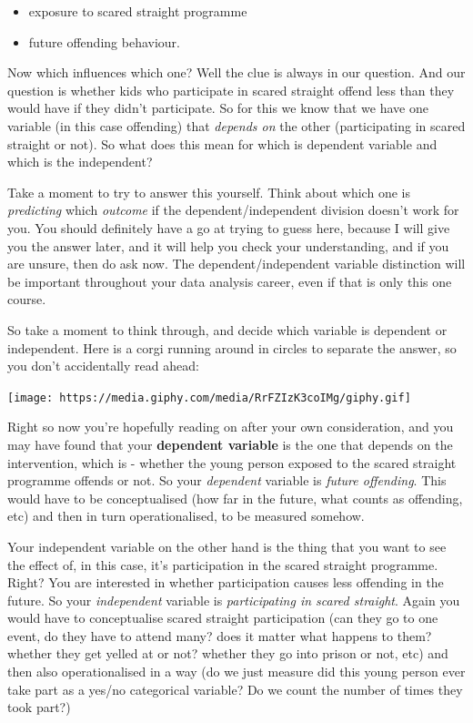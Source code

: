 \documentclass[]{book}
\providecommand{\tightlist}{%
  \setlength{\itemsep}{0pt}\setlength{\parskip}{0pt}}
\theoremstyle{definition}
\theoremstyle{definition}
\theoremstyle{definition}
\theoremstyle{remark}
\begin{document}
\begin{itemize}
\tightlist
\item
  exposure to scared straight programme
\item
  future offending behaviour.
\end{itemize}

Now which influences which one? Well the clue is always in our question.
And our question is whether kids who participate in scared straight
offend less than they would have if they didn't participate. So for this
we know that we have one variable (in this case offending) that
\emph{depends on} the other (participating in scared straight or not).
So what does this mean for which is dependent variable and which is the
independent?

Take a moment to try to answer this yourself. Think about which one is
\emph{predicting} which \emph{outcome} if the dependent/independent
division doesn't work for you. You should definitely have a go at trying
to guess here, because I will give you the answer later, and it will
help you check your understanding, and if you are unsure, then do ask
now. The dependent/independent variable distinction will be important
throughout your data analysis career, even if that is only this one
course.

So take a moment to think through, and decide which variable is
dependent or independent. Here is a corgi running around in circles to
separate the answer, so you don't accidentally read ahead:

\texttt{[image: https://media.giphy.com/media/RrFZIzK3coIMg/giphy.gif]}

Right so now you're hopefully reading on after your own consideration,
and you may have found that your \textbf{dependent variable} is the one
that depends on the intervention, which is - whether the young person
exposed to the scared straight programme offends or not. So your
\emph{dependent} variable is \emph{future offending}. This would have to
be conceptualised (how far in the future, what counts as offending, etc)
and then in turn operationalised, to be measured somehow.

Your independent variable on the other hand is the thing that you want
to see the effect of, in this case, it's participation in the scared
straight programme. Right? You are interested in whether participation
causes less offending in the future. So your \emph{independent} variable
is \emph{participating in scared straight}. Again you would have to
conceptualise scared straight participation (can they go to one event,
do they have to attend many? does it matter what happens to them?
whether they get yelled at or not? whether they go into prison or not,
etc) and then also operationalised in a way (do we just measure did this
young person ever take part as a yes/no categorical variable? Do we
count the number of times they took part?)
\end{document}
